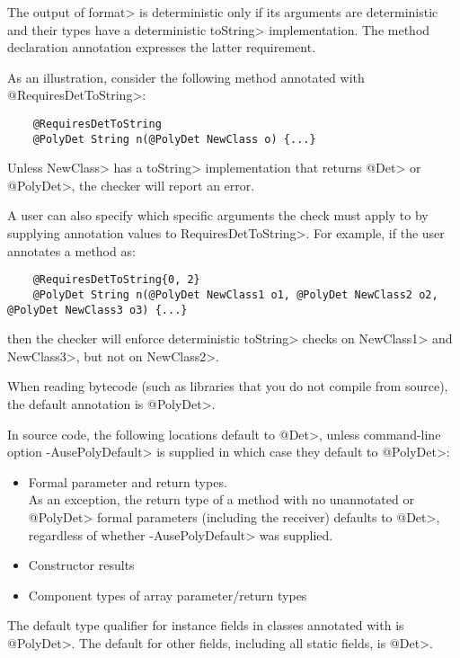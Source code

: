 The output of \<format> is deterministic only if its arguments are
deterministic and their types have a deterministic \<toString> implementation.
The method declaration annotation
 expresses the
latter requirement.

As an illustration, consider the following method annotated with \<@RequiresDetToString>:
\begin{Verbatim}
    @RequiresDetToString
    @PolyDet String n(@PolyDet NewClass o) {...}
\end{Verbatim}
Unless \<NewClass> has a \<toString> implementation that returns \<@Det> or \<@PolyDet>,
the checker will report an error.

A user can also specify which specific arguments the check must apply to by
supplying annotation values to \<RequiresDetToString>.
For example, if the user annotates a method as:
\begin{Verbatim}
    @RequiresDetToString{0, 2}
    @PolyDet String n(@PolyDet NewClass1 o1, @PolyDet NewClass2 o2, @PolyDet NewClass3 o3) {...}
\end{Verbatim}
then the checker will enforce deterministic \<toString> checks on \<NewClass1> and \<NewClass3>,
but not on \<NewClass2>.



When reading bytecode (such as libraries that you do not compile from
source), the default annotation is \<@PolyDet>.

In source code, the following locations default to
\<@Det>, unless command-line option \<-AusePolyDefault> is supplied in
which case they default to \<@PolyDet>:
\begin{itemize}
    \item Formal parameter and return types. \\
      As an exception, the return type of a method with no unannotated or
    \<@PolyDet> formal parameters (including the receiver) defaults to
    \<@Det>, regardless of whether \<-AusePolyDefault> was supplied.
    \item Constructor results
    \item Component types of array parameter/return types
\end{itemize}

The default type qualifier for instance fields in classes annotated with
 is \<@PolyDet>.
The default for other fields, including all static fields, is \<@Det>.

